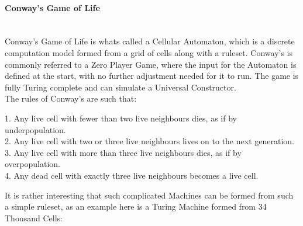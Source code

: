 \begin{flushleft}
                    \paragraph{Conway's Game of Life} \mbox{} \\
                        \vspace{0.2cm}
                        Conway's Game of Life is whats called a Cellular Automaton, which is a discrete computation model formed from a grid of cells along with 
                        a ruleset. Conway's is commonly referred to a Zero Player Game, where the input for the Automaton is defined at the start, with no
                        further adjustment needed for it to run. The game is fully Turing complete and can simulate a Universal Constructor. \\
                        \vspace{0.2cm}
                        The rules of Conway's are such that: \\

                        \vspace{0.2cm}
                        \begin{addmargin}[2em]{0em}
                            \large
                            1. Any live cell with fewer than two live neighbours dies, as if by underpopulation. \\
                            2. Any live cell with two or three live neighbours lives on to the next generation. \\
                            3. Any live cell with more than three live neighbours dies, as if by overpopulation. \\
                            4. Any dead cell with exactly three live neighbours becomes a live cell. \\
                        \end{addmargin}

                        \vspace{0.2cm}
                        It is rather interesting that such complicated Machines can be formed from such a simple ruleset, as an example 
                        here is a Turing Machine formed from 34 Thousand Cells: \\


\end{flushleft}
